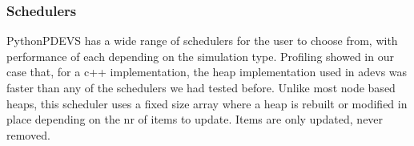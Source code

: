 \subsubsection{Schedulers}
PythonPDEVS has a wide range of schedulers for the user to choose from, with performance of each depending on the simulation type. Profiling showed in our case that, for a c++ implementation, the heap implementation used in adevs was faster than any of the schedulers we had tested before. Unlike most node based heaps, this scheduler uses a fixed size array where a heap is rebuilt or modified in place depending on the nr of items to update. Items are only updated, never removed.
